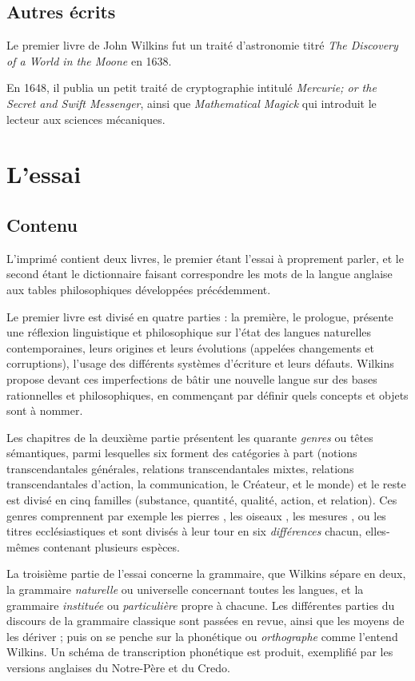 \subsection{Autres écrits}
Le premier livre de John Wilkins fut un traité d'astronomie titré \emph{The Discovery of a World in the Moone} en 1638.

En 1648, il publia un petit traité de cryptographie intitulé \emph{Mercurie; or the Secret and Swift Messenger}, ainsi que \emph{Mathematical Magick} qui introduit le lecteur aux sciences mécaniques.
\section{L'essai}\label{WilkinsEssai}
\subsection{Contenu}
L'imprimé contient deux livres, le premier étant l'essai à proprement parler, et le second étant le dictionnaire faisant correspondre les mots de la langue anglaise aux tables philosophiques développées précédemment.

Le premier livre est divisé en quatre parties : la première, le prologue, présente une réflexion linguistique et philosophique sur l'état des langues naturelles contemporaines, leurs origines et leurs évolutions (appelées \og changements et corruptions\fg), l'usage des différents systèmes d'écriture et leurs défauts.
Wilkins propose devant ces imperfections de bâtir une nouvelle langue sur des bases rationnelles et philosophiques, en commençant par définir quels concepts et objets sont à nommer.

Les chapitres de la deuxième partie présentent les quarante \emph{genres} ou têtes sémantiques, parmi lesquelles six forment des catégories à part (\og notions transcendantales générales\fg, \og relations transcendantales mixtes\fg, \og relations transcendantales d'action\fg, \og la communication\fg, \og le Créateur\fg, et \og le monde\fg) et le reste est divisé en cinq familles (\og substance\fg, \og quantité\fg, \og qualité\fg, \og action\fg, et \og relation\fg).
Ces genres comprennent par exemple \og les pierres \fg, \og les oiseaux \fg, \og les mesures \fg, ou \og les titres ecclésiastiques \fg et sont divisés à leur tour en six \emph{différences} chacun, elles-mêmes contenant plusieurs espèces.

La troisième partie de l'essai concerne la grammaire, que Wilkins sépare en deux, la grammaire \emph{naturelle} ou universelle concernant toutes les langues, et la grammaire \emph{instituée} ou \emph{particulière} propre à chacune.
Les différentes parties du discours de la grammaire classique sont passées en revue, ainsi que les moyens de les dériver ; puis on se penche sur la phonétique ou \emph{orthographe} comme l'entend Wilkins.
Un schéma de transcription phonétique est produit, exemplifié par les versions anglaises du Notre-Père et du Credo.

